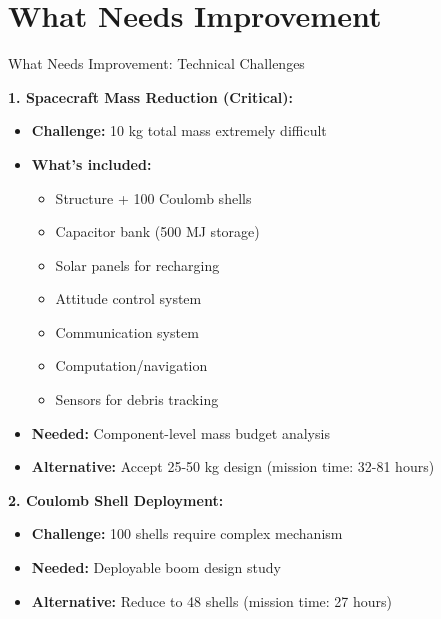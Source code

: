 \documentclass[11pt]{beamer}
\begin{document}
\section{What Needs Improvement}

\begin{frame}{What Needs Improvement: Technical Challenges}

\textbf{1. Spacecraft Mass Reduction (Critical):}
\begin{itemize}
\item \textbf{Challenge:} 10 kg total mass extremely difficult
\item \textbf{What's included:}
\begin{itemize}
\item Structure + 100 Coulomb shells
\item Capacitor bank (500 MJ storage)
\item Solar panels for recharging
\item Attitude control system
\item Communication system
\item Computation/navigation
\item Sensors for debris tracking
\end{itemize}
\item \textbf{Needed:} Component-level mass budget analysis
\item \textbf{Alternative:} Accept 25-50 kg design (mission time: 32-81 hours)
\end{itemize}

\vspace{0.2cm}

\textbf{2. Coulomb Shell Deployment:}
\begin{itemize}
\item \textbf{Challenge:} 100 shells require complex mechanism
\item \textbf{Needed:} Deployable boom design study
\item \textbf{Alternative:} Reduce to 48 shells (mission time: 27 hours)
\end{itemize}

\end{frame}
\end{document}
